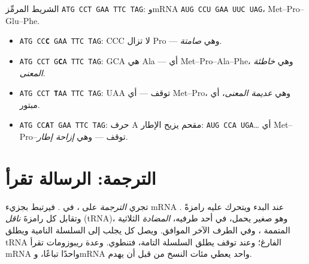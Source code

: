 \begin{example}\label{ex:g11:gene-expression:outcomes}
الشريط المرمِّز \texttt{ATG CCT GAA TTC TAG}: وmRNA
\texttt{AUG CCU GAA UUC UAG}،  Met--Pro--Glu--Phe.
\begin{itemize}
  \item \texttt{ATG CC\textbf{C} GAA TTC TAG}:  CCC لا تزال Pro ---
        وهي \emph{صامتة}.
  \item \texttt{ATG CCT G\textbf{C}A TTC TAG}:  GCA هي Ala ---
        أي Met--Pro--Ala--Phe، وهي \emph{خاطئة المعنى}.
  \item \texttt{ATG CCT \textbf{T}AA TTC TAG}:  UAA توقف ---
        أي Met--Pro، وهي \emph{عديمة المعنى}، أي  مبتور.
  \item \texttt{ATG CC\textbf{A}T GAA TTC TAG}: حرف A مقحم يزيح
        الإطار: \texttt{AUG CCA UGA}\dots{} أي Met--Pro--توقف ---
        وهي \emph{إزاحة إطار}.
\end{itemize}
\end{example}

\section{الترجمة: الرسالة تقرأ}

\begin{proposition}[الترجمة]\label{prop:g11:gene-expression:translation}
تجري \emph{الترجمة} على \emph{}، في
. فيرتبط  بجزيء mRNA عند  البدء ويتحرك عليه رامزةً
. وتقابل كل رامزةَ \emph{ ناقل} (tRNA)، وهو  صغير يحمل، في
أحد طرفيه، \emph{ المضادة} الثلاثية  المتممة
، وفي الطرف الآخر  الموافق. ويصل  كل  يجلب إلى السلسلة النامية ويطلق tRNA الفارغ؛ وعند  توقف يطلق
السلسلة التامة، فتنطوي. وعدة ريبوزومات تقرأ mRNA واحدًا تباعًا، وmRNA
واحد يعطي مئات النسخ من  قبل أن يهدم.
\end{proposition}
\admitted

